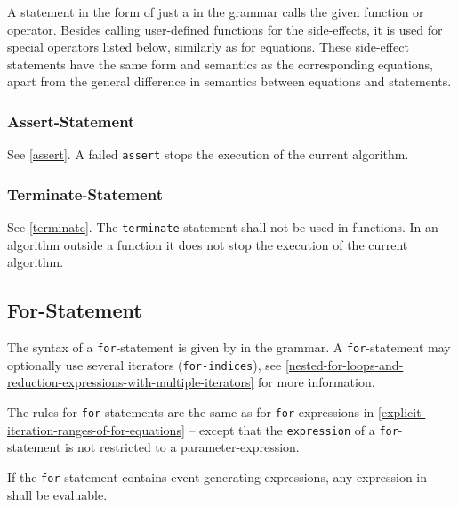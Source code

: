 A statement in the form of just a  in the grammar calls the given function or operator.
Besides calling user-defined functions for the side-effects, it is used for special operators listed below, similarly as for equations.
These side-effect statements have the same form and semantics as the corresponding equations, apart from the general difference in semantics between equations and statements.

\subsubsection{Assert-Statement}\label{assert-statement}

See \cref{assert}.
A failed \lstinline!assert! stops the execution of the current algorithm.

\subsubsection{Terminate-Statement}\label{terminate-statement}

See \cref{terminate}.
The \lstinline!terminate!-statement shall not be used in functions.
In an algorithm outside a function it does not stop the execution of the current algorithm.

\subsection{For-Statement}\label{for-statement}

The syntax of a \lstinline!for!-statement is given by  in the grammar.
A \lstinline!for!-statement may optionally use several iterators (\lstinline!for-indices!), see \cref{nested-for-loops-and-reduction-expressions-with-multiple-iterators} for more information.

The rules for \lstinline!for!-statements are the same as for \lstinline!for!-expressions in \cref{explicit-iteration-ranges-of-for-equations} -- except that the \lstinline!expression! of a \lstinline!for!-statement is not restricted to a parameter-expression.

If the \lstinline!for!-statement contains event-generating expressions, any expression in  shall be evaluable.


